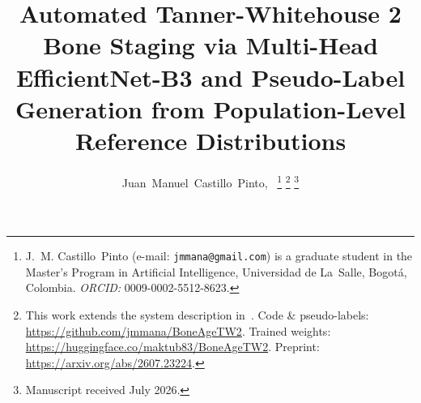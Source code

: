 \documentclass[journal]{IEEEtran}
\begin{document}
\title{Automated Tanner-Whitehouse 2 Bone Staging via Multi-Head EfficientNet-B3
  and Pseudo-Label Generation from Population-Level Reference Distributions}

\author{Juan~Manuel~Castillo~Pinto,~%
\thanks{J.~M. Castillo~Pinto (e-mail: \texttt{jmmana@gmail.com}) is a graduate
student in the Master's Program in Artificial Intelligence,
Universidad de La~Salle, Bogot\'{a}, Colombia.
\textit{ORCID:} 0009-0002-5512-8623.}%
\thanks{This work extends the system description in~\cite{castillo2026boneagetw2}.
Code \& pseudo-labels: \url{https://github.com/jmmana/BoneAgeTW2}.
Trained weights: \url{https://huggingface.co/maktub83/BoneAgeTW2}.
Preprint: \url{https://arxiv.org/abs/2607.23224}.}%
\thanks{Manuscript received July 2026.}}

\maketitle
\end{document}
